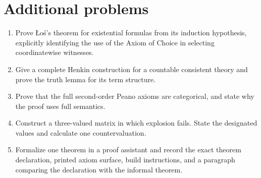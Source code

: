 \section{Additional problems}
\label{sec:qualifying-problems-06}

\begin{enumerate}
  \item Prove \L{}o\'s's theorem for existential formulas from its induction
        hypothesis, explicitly identifying the use of the Axiom of Choice in
        selecting coordinatewise witnesses.
  \item Give a complete Henkin construction for a countable consistent theory
        and prove the truth lemma for its term structure.
  \item Prove that the full second-order Peano axioms are categorical, and state
        why the proof uses full semantics.
  \item Construct a three-valued matrix in which explosion fails.  State the
        designated values and calculate one countervaluation.
  \item Formalize one theorem in a proof assistant and record the exact theorem
        declaration, printed axiom surface, build instructions, and a paragraph
        comparing the declaration with the informal theorem.
\end{enumerate}

